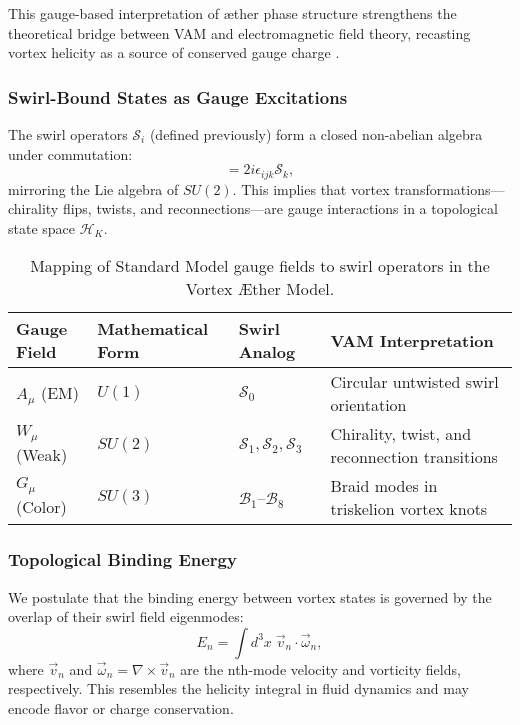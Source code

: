 This gauge-based interpretation of æther phase structure strengthens the theoretical bridge between VAM and electromagnetic field theory, recasting vortex helicity as a source of conserved gauge charge \cite{verlinde2021qft,gross1996gauge,strangeway2005alfven}.


\subsubsection*{Swirl-Bound States as Gauge Excitations}

The swirl operators $\mathcal{S}_i$ (defined previously) form a closed non-abelian algebra under commutation:
\begin{equation}
[\mathcal{S}_i, \mathcal{S}_j] = 2i \epsilon_{ijk} \mathcal{S}_k,
\end{equation}
mirroring the Lie algebra of $SU(2)$. This implies that vortex transformations—chirality flips, twists, and reconnections—are gauge interactions in a topological state space $\mathcal{H}_K$.

\begin{table}[H]
    \centering
    \footnotesize
    \renewcommand{\arraystretch}{1.4}
    \begin{tabular}{|l|l|l|l|}
        \hline
        \textbf{Gauge Field} & \textbf{Mathematical Form} & \textbf{Swirl Analog} & \textbf{VAM Interpretation} \\
        \hline
        $A_\mu$ (EM) & $U(1)$ & $\mathcal{S}_0$ & Circular untwisted swirl orientation \\
        $W_\mu$ (Weak) & $SU(2)$ & $\mathcal{S}_1, \mathcal{S}_2, \mathcal{S}_3$ & Chirality, twist, and reconnection transitions \\
        $G_\mu$ (Color) & $SU(3)$ & $\mathcal{B}_1$–$\mathcal{B}_8$ & Braid modes in triskelion vortex knots \\
        \hline
    \end{tabular}
    \caption{Mapping of Standard Model gauge fields to swirl operators in the Vortex Æther Model.}
\end{table}

\subsubsection*{Topological Binding Energy}

We postulate that the binding energy between vortex states is governed by the overlap of their swirl field eigenmodes:
\begin{equation}
E_{n} = \int d^3x \; \vec{v}_n \cdot \vec{\omega}_n,
\end{equation}
where $\vec{v}_n$ and $\vec{\omega}_n = \nabla \times \vec{v}_n$ are the nth-mode velocity and vorticity fields, respectively. This resembles the helicity integral in fluid dynamics and may encode flavor or charge conservation.

